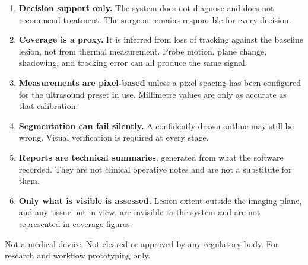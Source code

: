 \documentclass[11pt,a4paper]{article}
\begin{document}
\begin{enumerate}[leftmargin=1.6em]
  \item \textbf{Decision support only.} The system does not diagnose and does
  not recommend treatment. The surgeon remains responsible for every decision.

  \item \textbf{Coverage is a proxy.} It is inferred from loss of tracking
  against the baseline lesion, not from thermal measurement. Probe motion,
  plane change, shadowing, and tracking error can all produce the same signal.

  \item \textbf{Measurements are pixel-based} unless a pixel spacing has been
  configured for the ultrasound preset in use. Millimetre values are only as
  accurate as that calibration.

  \item \textbf{Segmentation can fail silently.} A confidently drawn outline
  may still be wrong. Visual verification is required at every stage.

  \item \textbf{Reports are technical summaries}, generated from what the
  software recorded. They are not clinical operative notes and are not a
  substitute for them.

  \item \textbf{Only what is visible is assessed.} Lesion extent outside the
  imaging plane, and any tissue not in view, are invisible to the system and
  are not represented in coverage figures.
\end{enumerate}

\vspace{1em}
\begin{warnbox}
Not a medical device. Not cleared or approved by any regulatory body. For
research and workflow prototyping only.
\end{warnbox}
\end{document}
